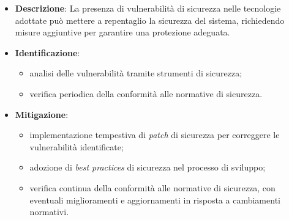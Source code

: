 \label{risk:problemi di sicurezza delle tecnologie utilizzate}
\begin{itemize}
	\item \textbf{Descrizione}: La presenza di vulnerabilità di sicurezza nelle tecnologie 
								adottate può mettere a repentaglio la sicurezza del sistema, 
								richiedendo misure aggiuntive per garantire una protezione adeguata.
	\item \textbf{Identificazione}:
	      \begin{itemize}
		      \item analisi delle vulnerabilità tramite strumenti di sicurezza;
		      
			  \item verifica periodica della conformità alle normative di sicurezza.
	      \end{itemize}

	\item \textbf{Mitigazione}:
	      \begin{itemize}
		      \item implementazione tempestiva di \textit{patch} di sicurezza per correggere le vulnerabilità identificate;

		      \item adozione di \textit{best practices} di sicurezza nel processo di sviluppo;
		      
			  \item verifica continua della conformità alle normative di sicurezza, con 
			  		eventuali miglioramenti e aggiornamenti in risposta a cambiamenti normativi.
	      \end{itemize}
\end{itemize}
